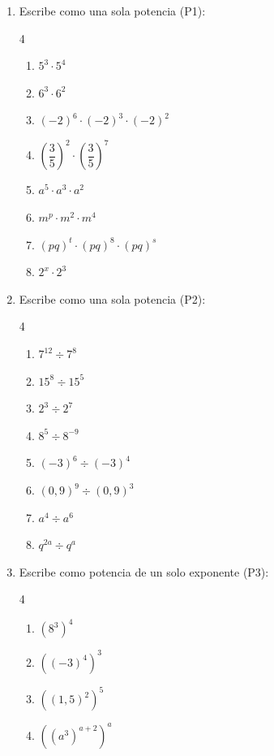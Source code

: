 \documentclass[11pt, letterpaper]{article}
\begin{document}
\begin{enumerate}[label=\textbf{\arabic*.}, leftmargin=*]
  \item Escribe como una sola potencia (P1):
  \begin{multicols}{4}
  \begin{enumerate}[label=\alph*)]
    \item $5^3\cdot 5^4$
    \item $6^3\cdot 6^2$
    \item $(-2)^6\cdot(-2)^3\cdot(-2)^2$
    \item $\left(\dfrac{3}{5}\right)^2\cdot\left(\dfrac{3}{5}\right)^7$
    \item $a^5\cdot a^3\cdot a^2$
    \item $m^p\cdot m^2\cdot m^4$
    \item $(pq)^t\cdot(pq)^8\cdot(pq)^s$
    \item $2^x\cdot 2^3$
  \end{enumerate}
  \end{multicols}

  \item Escribe como una sola potencia (P2):
  \begin{multicols}{4}
  \begin{enumerate}[label=\alph*)]
    \item $7^{12} \div 7^8$
    \item $15^8 \div 15^5$
    \item $2^3 \div 2^7$
    \item $8^5 \div 8^{-9}$
    \item $(-3)^6 \div (-3)^4$
    \item $(0{,}9)^9 \div (0{,}9)^3$
    \item $a^4 \div a^6$
    \item $q^{2a} \div q^a$
  \end{enumerate}
  \end{multicols}

  \item Escribe como potencia de un solo exponente (P3):
  \begin{multicols}{4}
  \begin{enumerate}[label=\alph*)]
    \item $(8^3)^4$
    \item $((-3)^4)^3$
    \item $((1{,}5)^2)^5$
    \item $((a^3)^{a+2})^a$
  \end{enumerate}
  \end{multicols}


\end{enumerate}
\end{document}
